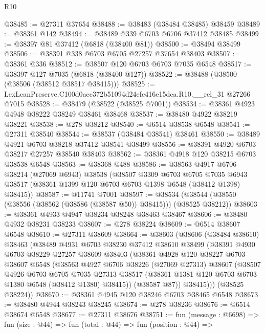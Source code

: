 \begin{lexlean}{R10}
\begin{coremodule}
@38485 := @27311 @37654
@38488 := @38483 (@38484 @38485) @38459
@38489 := @38361 @142
@38494 := @38489 @339 @6703 @6706 @37412 @38485
@38499 := @38397 @81 @37412 (@6818 (@38400 @81))
@38500 := @38494 @38499
@38506 := @38391 @338 @6703 @6705 @27257 @37654 @38403
@38507 := @38361 @336
@38512 := @38507 @120 @6703 @6703 @7035 @6548
@38517 := @38397 @127 @7035 (@6818 (@38400 @127))
@38522 := @38488 (@38500 (@38506 (@38512 @38517 @38415)))
@38525 := LexLeanPreserve.C100d0aec372b51094d24efe416e15dca.R10.__rel_31 @27266 @7015
@38528 := @38479 (@38522 (@38525 @7001))
@38534 := @38361 @4923 @4948 @38222 @38249 @38461 @38468
@38537 := @38480 @4922 @38219 @38221
@38538 := @278 @38212
@38540 := @6514 @38538 @6548
@38541 := @27311 @38540
@38544 := @38537 (@38484 @38541) @38461
@38550 := @38489 @4921 @6703 @38218 @37412 @38541 @38499
@38556 := @38391 @4920 @6703 @38217 @27257 @38540 @38403
@38562 := @38361 @4918 @120 @38215 @6703 @38538 @6548
@38563 := @38368 @488
@38586 := @38563
    @4917
    @6706
    @38214
    (@27069 @6943)
    @38538
    (@38507
      @3309
      @6703
      @6705
      @7035
      @6943
      @38517
      (@38361 @1399 @120 @6703 @6703 @1398 @6548 (@38412 @1398) @38415))
@38587 := @11741 @7001
@38597 := @38534 (@38544 (@38550 (@38556 (@38562 (@38586 (@38587 @50)) @38415))) (@38525 @38212))
@38603 := @38361 @4933 @4947 @38234 @38248 @38463 @38467
@38606 := @38480 @4932 @38231 @38233
@38607 := @278 @38224
@38609 := @6514 @38607 @6548
@38610 := @27311 @38609
@38664 := @38603
    (@38606
      (@38484 @38610)
      @38463
      (@38489
        @4931
        @6703
        @38230
        @37412
        @38610
        @38499
        (@38391
          @4930
          @6703
          @38229
          @27257
          @38609
          @38403
          (@38361
            @4928
            @120
            @38227
            @6703
            @38607
            @6548
            (@38563
              @4927
              @6706
              @38226
              (@27069 @27313)
              @38607
              (@38507
                @4926
                @6703
                @6705
                @7035
                @27313
                @38517
                (@38361 @1381 @120 @6703 @6703 @1380 @6548 (@38412 @1380) @38415))
              (@38587 @87))
            @38415)))
      (@38525 @38224))
@38670 := @38361 @4945 @120 @38246 @6703 @38465 @6548
@38673 := @38480 @4944 @38243 @38245
@38674 := @278 @38236
@38676 := @6514 @38674 @6548
@38677 := @27311 @38676
@38751 := fun (message : @6698) =>
  fun (size : @44) =>
  fun (total : @44) =>
  fun (position : @44) =>

\end{coremodule}
\end{lexlean}
